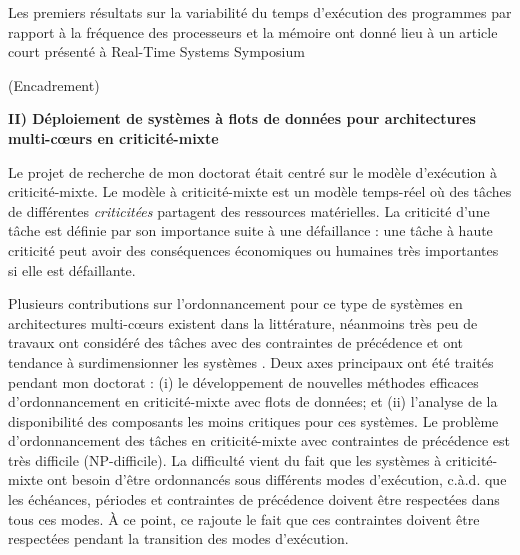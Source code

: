 \documentclass{article}
\begin{document}

Les premiers résultats sur la variabilité du temps d'exécution  des programmes par rapport à la fréquence 
des processeurs et la mémoire ont donné lieu à un article court présenté à Real-Time Systems Symposium

(Encadrement)
\vspace{.5cm}

\textbf{II) Déploiement de systèmes à flots de données pour architectures multi-c\oe{}urs en criticité-mixte}
\vspace{.5cm}

Le projet de recherche de mon doctorat était centré sur le modèle d'exécution à criticité-mixte. Le modèle à 
criticité-mixte est un modèle temps-réel où des tâches de différentes \textit{criticitées} partagent des 
ressources matérielles. La criticité d'une tâche est définie par son importance suite à une défaillance : une 
tâche à haute criticité peut avoir des conséquences économiques ou humaines très importantes si elle est 
défaillante.

Plusieurs contributions sur l'ordonnancement pour ce type de systèmes en architectures  multi-c\oe{}urs 
existent dans la littérature, néanmoins très peu de travaux ont considéré des tâches avec des contraintes de 
précédence et ont tendance à surdimensionner les systèmes . Deux axes principaux ont été traités pendant 
mon doctorat : (i) le développement de nouvelles méthodes efficaces d'ordonnancement en criticité-mixte 
avec flots de données; et (ii) l'analyse de la disponibilité des composants les moins critiques pour ces 
systèmes. Le problème d'ordonnancement des tâches en criticité-mixte avec contraintes de précédence est 
très difficile (NP-difficile). La difficulté vient du fait que les systèmes à criticité-mixte ont besoin d'être 
ordonnancés sous différents modes d'exécution, c.à.d. que les échéances, périodes et contraintes de 
précédence doivent être respectées dans tous ces modes. À ce point, ce rajoute le fait que ces contraintes 
doivent être respectées pendant la transition des modes d'exécution.
\end{document}

